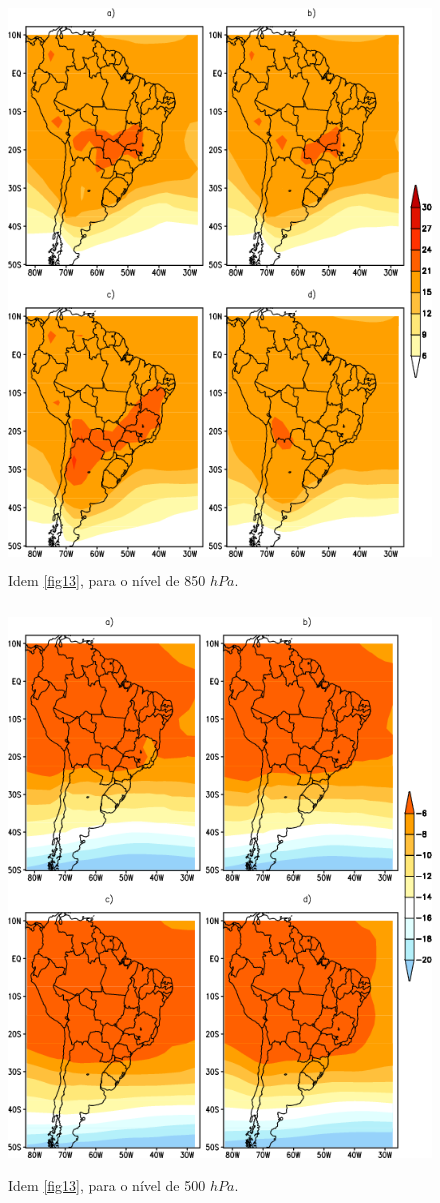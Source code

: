 \begin{figure}[!hbp]
\centering
\includegraphics[height=15cm]{./figs/media_temp_anl_850hPa.png}
\caption{Idem \autoref{fig13}, para o nível de 850 $hPa$.}
\label{fig20}
\end{figure}

\begin{figure}[!hbp]
\centering
\includegraphics[height=15cm]{./figs/media_temp_anl_500hPa.png}
\caption{Idem \autoref{fig13}, para o nível de 500 $hPa$.}
\label{fig21}
\end{figure}

